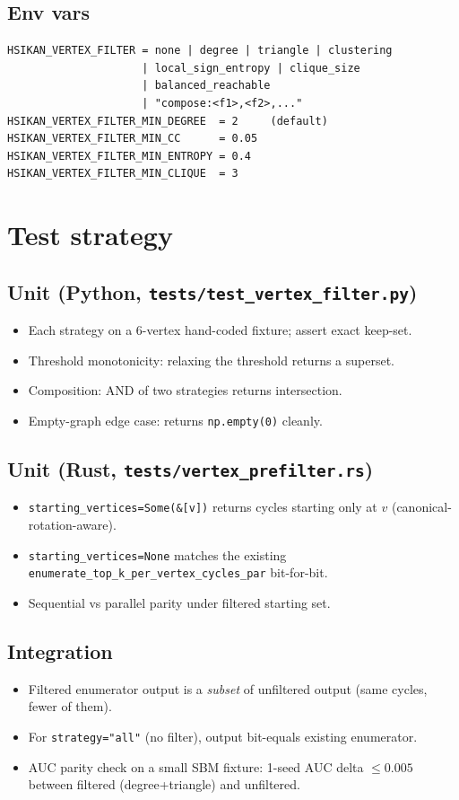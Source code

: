 \documentclass[11pt,a4paper]{article}
\begin{document}
\subsection*{Env vars}
\begin{lstlisting}
HSIKAN_VERTEX_FILTER = none | degree | triangle | clustering
                     | local_sign_entropy | clique_size
                     | balanced_reachable
                     | "compose:<f1>,<f2>,..."
HSIKAN_VERTEX_FILTER_MIN_DEGREE  = 2     (default)
HSIKAN_VERTEX_FILTER_MIN_CC      = 0.05
HSIKAN_VERTEX_FILTER_MIN_ENTROPY = 0.4
HSIKAN_VERTEX_FILTER_MIN_CLIQUE  = 3
\end{lstlisting}

\section{Test strategy}

\subsection*{Unit (Python, \texttt{tests/test\_vertex\_filter.py})}
\begin{itemize}
\item Each strategy on a 6-vertex hand-coded fixture; assert exact keep-set.
\item Threshold monotonicity: relaxing the threshold returns a superset.
\item Composition: AND of two strategies returns intersection.
\item Empty-graph edge case: returns \texttt{np.empty(0)} cleanly.
\end{itemize}

\subsection*{Unit (Rust, \texttt{tests/vertex\_prefilter.rs})}
\begin{itemize}
\item \texttt{starting\_vertices=Some(\&[v])} returns cycles starting only
  at $v$ (canonical-rotation-aware).
\item \texttt{starting\_vertices=None} matches the existing
  \texttt{enumerate\_top\_k\_per\_vertex\_cycles\_par} bit-for-bit.
\item Sequential vs parallel parity under filtered starting set.
\end{itemize}

\subsection*{Integration}
\begin{itemize}
\item Filtered enumerator output is a \emph{subset} of unfiltered output
  (same cycles, fewer of them).
\item For \texttt{strategy="all"} (no filter), output bit-equals existing
  enumerator.
\item AUC parity check on a small SBM fixture: 1-seed AUC delta
  $\leq 0.005$ between filtered (degree+triangle) and unfiltered.
\end{itemize}
\end{document}
